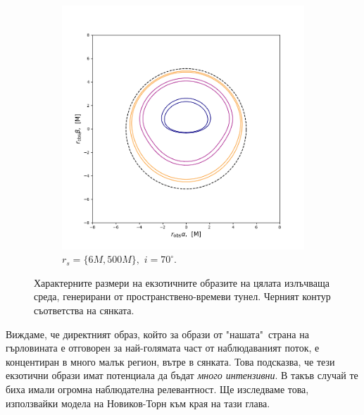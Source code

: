 \begin{figure}[!htb]
\begin{subfigure}{6cm}
		\includegraphics[scale = 0.35]{WH_70_deg_r6_r500.png}
		\caption{$r_s = \{6M, 500M\},\,\, i = 70^\circ$.}
	\end{subfigure}
	\caption[Характерните размери на екзотичните образите на цялата излъчваща среда, генерирани от пространствено-времеви тунел.]{\small Характерните размери на екзотичните образите на цялата излъчваща среда, генерирани от пространствено-времеви тунел. Черният контур съответства на сянката.} 
	\label{WH_img_size_deg}
\end{figure}
Виждаме, че директният образ, който за образи от "нашата"$\,$ страна на гърловината е отговорен за най-голямата част от наблюдаваният поток, е концентиран в много малък регион, вътре в сянката. Това подсказва, че тези екзотични образи имат потенциала да бъдат \emph{много интензивни}. В такъв случай те биха имали огромна наблюдателна релевантност. Ще изследваме това, използвайки модела на Новиков-Торн към края на тази глава.\\ 

